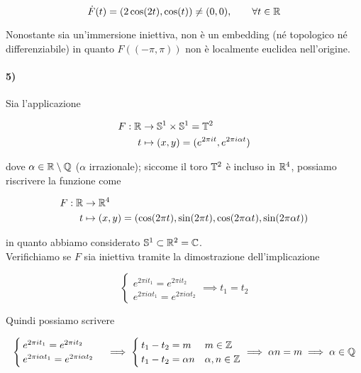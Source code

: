 \begin{equation}
	\dot{F}(t) = (2 \cos(2t), \cos(t)) \neq (0,0), \qquad \forall t \in \mathbb{R}
\end{equation}

Nonostante sia un'immersione iniettiva, non è un embedding (né topologico né differenziabile) in quanto $ F((-\pi,\pi)) $ non è localmente euclidea nell'origine.

\paragraph{5)}

Sia l'applicazione

\begin{align}
	\begin{split}
		F : \mathbb{R} &\to \mathbb{S}^{1} \times \mathbb{S}^{1} = \mathbb{T}^{2}\\
		t &\mapsto (x,y) = (e^{2 \pi i t}, e^{2 \pi i \alpha t})
	\end{split}
\end{align}

dove $ \alpha \in \mathbb{R} \setminus \mathbb{Q} $ ($ \alpha $ irrazionale); siccome il toro $ \mathbb{T}^{2} $ è incluso in $ \mathbb{R}^{4} $, possiamo riscrivere la funzione come

\begin{align}
	\begin{split}
		F : \mathbb{R} &\to \mathbb{R}^{4}\\
		t &\mapsto (x,y) = (\cos(2 \pi t), \sin(2 \pi t), \cos(2 \pi \alpha t), \sin(2 \pi \alpha t))
	\end{split}
\end{align}

in quanto abbiamo considerato $ \mathbb{S}^{1} \subset \mathbb{R}^{2} = \mathbb{C} $.\\
Verifichiamo se $ F $ sia iniettiva tramite la dimostrazione dell'implicazione

\begin{equation}
	\begin{cases}
		e^{2 \pi i t_{1}} = e^{2 \pi i t_{2}}\\
		e^{2 \pi i \alpha t_{1}} = e^{2 \pi i \alpha t_{2}}
	\end{cases}%
	\implies%
	t_{1} = t_{2}
\end{equation}

Quindi possiamo scrivere

\begin{equation}
	\begin{cases}
		e^{2 \pi i t_{1}} = e^{2 \pi i t_{2}}\\
		e^{2 \pi i \alpha t_{1}} = e^{2 \pi i \alpha t_{2}}
	\end{cases}%
	\implies%
	\begin{cases}
		t_{1} - t_{2} = m & m \in \Z\\
		t_{1} - t_{2} = \alpha n & \alpha,n \in \Z
	\end{cases}%
	\implies%
	\alpha n = m%
	\implies%
	\alpha \in \Q
\end{equation}

